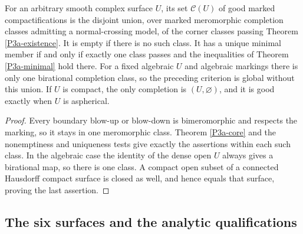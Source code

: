 \begin{corollary}
\label{P3a-analytic-scope}
For an arbitrary smooth complex surface $U$, its set $\mathcal C(U)$
of good marked compactifications is the disjoint union, over
marked meromorphic completion classes admitting a normal-crossing
model, of the corner classes passing Theorem \ref{P3a-existence}.
It is empty if there is no such class. It has a unique minimal
member if and only if exactly one class passes and the inequalities
of Theorem \ref{P3a-minimal} hold there. For a fixed algebraic $U$
and algebraic markings there is only one birational completion
class, so the preceding criterion is global without this union.
If $U$ is compact, the only completion is $(U,\varnothing)$,
and it is good exactly when $U$ is aspherical.
\end{corollary}
\begin{proof}
Every boundary blow-up or blow-down is bimeromorphic and respects
the marking, so it stays in one meromorphic class. Theorem
\ref{P3a-core} and the nonemptiness and uniqueness tests give
exactly the assertions within each such class. In the algebraic
case the identity of the dense open $U$ always gives a birational
map, so there is one class. A compact open subset of a connected
Hausdorff compact surface is closed as well, and hence equals
that surface, proving the last assertion.
\end{proof}

\subsection{The six surfaces and the analytic qualifications}

